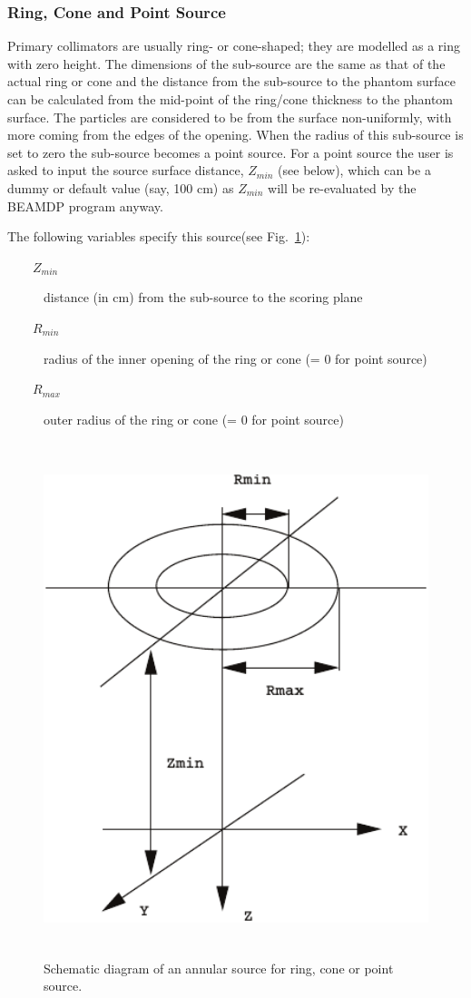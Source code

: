 \documentclass[12pt,twoside]{article}
\begin{document}
\subsubsection{Ring, Cone and Point Source}
Primary collimators are usually ring- or cone-shaped; they are modelled as a ring with zero height. The dimensions of the sub-source are the same as that of the actual ring or cone and the distance from the sub-source to the phantom surface can be calculated from the mid-point of the ring/cone thickness to the phantom surface. The particles are considered to be from the surface non-uniformly, with more coming from the edges of the opening.
When the radius of this sub-source is set to zero the sub-source becomes a point source. For a point source the user is asked to input the source surface distance, $Z_{min}$ (see below), which can be a dummy or default value (say, 100 cm) as $Z_{min}$ will be re-evaluated by the BEAMDP program anyway.

The following variables specify this source(see Fig.~\ref{source3}):

\begin{description}
\item [~~~~$Z_{min}$] distance (in cm) from the sub-source to the scoring plane
\item [~~~~$R_{min}$] radius of the inner opening of the ring or cone (= 0 for point source)
\item [~~~~$R_{max}$] outer radius of the ring or cone (= 0 for point source)
\end{description}

\begin{figure}[htbp]
\includegraphics[height=15cm]{figures/source3}
\caption[]
{Schematic diagram of an annular source for ring, cone or point source. }
\label{source3}
\end{figure}
\end{document}
